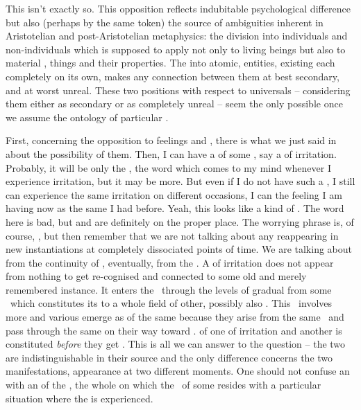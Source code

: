 This isn't exactly so. This opposition reflects indubitable psychological
difference but also (perhaps by the same token) the source of ambiguities
inherent in Aristotelian and post-Aristotelian metaphysics: the division into
individuals and non-individuals which is supposed to apply  not
only to living beings but also to material , things and their
properties. The  into atomic,  entities,
existing each completely on its own, makes any connection between them at best
secondary, and at worst unreal. These two positions with respect to universals
-- considering them either as secondary or as completely unreal --
seem the only possible once we assume the ontology of particular .

\pa
First, concerning the opposition to feelings and , there is what we
just said in  about the possibility of 
them.  Then, I can have a  of some , say a
 of irritation. Probably, it will be only the , the word
which comes to my mind whenever I experience irritation, but it may be more.
But even if I do not have such a , I still can experience the same
irritation on different occasions, I can  the feeling I am having
now as the same I had before. Yeah, this looks like a kind of .  The word  here is bad, but  and
 are definitely on the proper place.  The worrying phrase
is, of course, , but then remember that we are not talking about
any  reappearing in new instantiations at completely dissociated
points of time. We are talking about  from the continuity of
, eventually, from the . A  of
irritation does not appear from nothing to get re-cognised and connected to some
old and merely remembered instance. It enters the \hoa\ through the levels of
gradual  {from} some \nexus\ which constitutes its
 to a whole field of other, possibly also .  This \nexus\ involves more  and various
 emerge as  of the same because they arise
from the same \nexus\ and pass through the same  on their way toward
.   of one  of irritation and
another is constituted {\em before} they get  .
This is all we can answer to the question  -- the two are indistinguishable in their
 source and the only difference concerns the two 
manifestations, appearance at two different moments. One should not confuse an  with an 
 of the , the whole  on which the \nexus\ of
some  resides with a particular situation where the
 is experienced.

